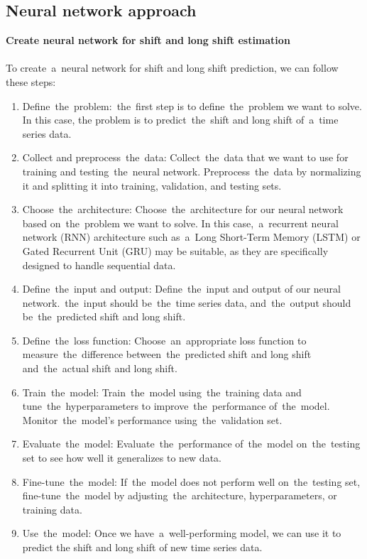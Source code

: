         \subsection{Neural network approach} \label{subsec:neural}
        \textbf{Create neural network for shift and long shift estimation}\\
        \\
        To create~a~neural network for shift and long shift prediction, we can follow these steps:
        \begin{enumerate}
            \item Define~the~problem:~the~first step is to define~the~problem we want to solve. In this case, the
            problem is to predict~the~shift and long shift of~a~time series data.
            \item Collect and preprocess~the~data: Collect~the~data that we want to use for training and
            testing~the~neural network. Preprocess~the~data by normalizing it and splitting it into training,
            validation, and testing sets.
            \item Choose~the~architecture: Choose~the~architecture for our neural network based on~the~problem
            we want to solve. In this case,~a~recurrent neural network (RNN) architecture such as~a~Long Short-Term
            Memory (LSTM) or Gated Recurrent Unit (GRU) may be suitable, as they are specifically designed to handle
            sequential data.
            \item Define~the~input and output: Define~the~input and output of our neural network.~the~input should
            be~the~time series data, and~the~output should be~the~predicted shift and long shift.
            \item Define~the~loss function: Choose~an~appropriate loss function to measure~the~difference
            between~the~predicted shift and long shift and~the~actual shift and long shift.
            \item Train~the~model: Train~the~model using~the~training data and tune~the~hyperparameters to
            improve~the~performance of~the~model. Monitor~the~model's performance using~the~validation set.
            \item Evaluate~the~model: Evaluate~the~performance of~the~model on~the~testing set to see how well
            it generalizes to new data.
            \item Fine-tune~the~model: If~the~model does not perform well on~the~testing set, fine-tune~the~model by
            adjusting~the~architecture, hyperparameters, or training data.
            \item Use~the~model: Once we have~a~well-performing model, we can use it to predict the
            shift and long shift of new time series data.
        \end{enumerate}
